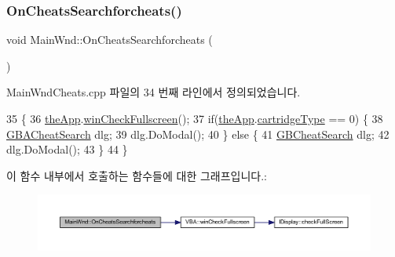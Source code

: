 \mbox{\label{class_main_wnd_aab3f78322d45b6e9300a8399b19bf35a}} 
\subsubsection{\texorpdfstring{On\+Cheats\+Searchforcheats()}{OnCheatsSearchforcheats()}}
{\footnotesize\ttfamily void Main\+Wnd\+::\+On\+Cheats\+Searchforcheats (\begin{DoxyParamCaption}{ }\end{DoxyParamCaption})\hspace{0.3cm}{\ttfamily [protected]}}



Main\+Wnd\+Cheats.\+cpp 파일의 34 번째 라인에서 정의되었습니다.


\begin{DoxyCode}
35 \{
36   \mbox{\hyperlink{_v_b_a_8cpp_a8095a9d06b37a7efe3723f3218ad8fb3}{theApp}}.\mbox{\hyperlink{class_v_b_a_a340eaeeb7fcfc242f08ac3442d991a96}{winCheckFullscreen}}();
37   \textcolor{keywordflow}{if}(\mbox{\hyperlink{_v_b_a_8cpp_a8095a9d06b37a7efe3723f3218ad8fb3}{theApp}}.\mbox{\hyperlink{class_v_b_a_af300759fcbc7eeb00ce73f956fc5ddb7}{cartridgeType}} == 0) \{
38     \mbox{\hyperlink{class_g_b_a_cheat_search}{GBACheatSearch}} dlg;
39     dlg.DoModal();
40   \} \textcolor{keywordflow}{else} \{
41     \mbox{\hyperlink{class_g_b_cheat_search}{GBCheatSearch}} dlg;
42     dlg.DoModal();
43   \}
44 \}
\end{DoxyCode}
이 함수 내부에서 호출하는 함수들에 대한 그래프입니다.\+:
\nopagebreak
\begin{figure}[H]
\begin{center}
\leavevmode
\includegraphics[width=350pt]{class_main_wnd_aab3f78322d45b6e9300a8399b19bf35a_cgraph}
\end{center}
\end{figure}
\mbox{\label{class_main_wnd_a81c7de136db9ecc6e98033ae3c3d511c}} 
